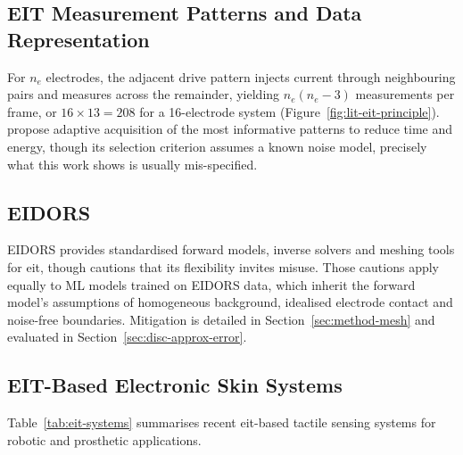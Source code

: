 \subsection{EIT Measurement Patterns and Data Representation}
\label{sec:lit-eit-patterns}

For $n_e$ electrodes, the adjacent drive pattern injects current through neighbouring pairs and measures across the remainder, yielding $n_e(n_e-3)$ measurements per frame, or $16 \times 13 = 208$ for a 16-electrode system \parencite{adler2009} (Figure~\ref{fig:lit-eit-principle}). \textcite{park2022ert} propose adaptive acquisition of the most informative patterns to reduce time and energy, though its selection criterion assumes a known noise model, precisely what this work shows is usually mis-specified.


\subsection{EIDORS}
\label{sec:lit-eit-eidors}

EIDORS provides standardised forward models, inverse solvers and meshing tools for \gls{eit}, though \textcite{adler2006} cautions that its flexibility invites misuse. Those cautions apply equally to ML models trained on EIDORS data, which inherit the forward model's assumptions of homogeneous background, idealised electrode contact and noise-free boundaries. Mitigation is detailed in Section~\ref{sec:method-mesh} and evaluated in Section~\ref{sec:disc-approx-error}.

\subsection{EIT-Based Electronic Skin Systems}
\label{sec:lit-eit-eskin}

Table~\ref{tab:eit-systems} summarises recent \gls{eit}-based tactile sensing systems for robotic and prosthetic applications.

